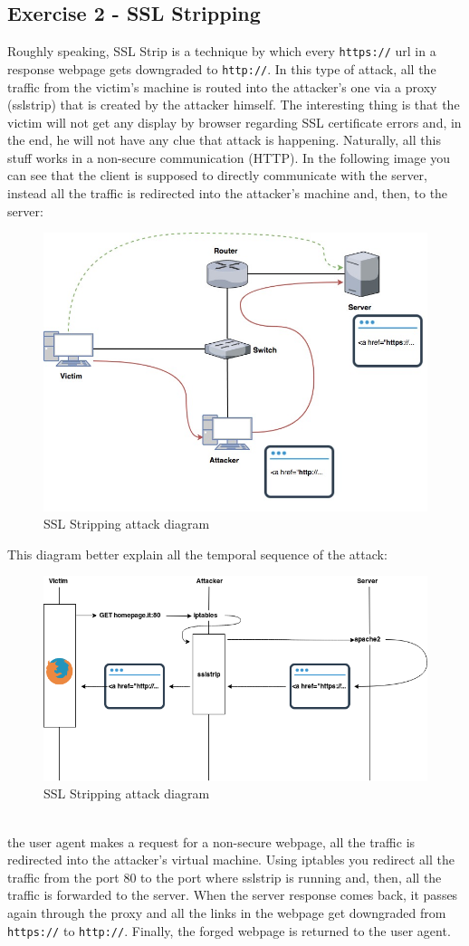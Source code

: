 \documentclass{article}
\begin{document}
\subsection{Exercise 2 - SSL Stripping}
Roughly speaking, SSL Strip is a technique by which every \texttt{https://} url in a response webpage gets downgraded to
\texttt{http://}. In this type of attack, all the traffic from the victim’s machine is routed into the attacker's one via a proxy (sslstrip) that is created by the attacker himself. The interesting thing is that the victim will not get any display by browser regarding SSL certificate errors and, in the end, he will not have any clue that attack is happening. Naturally, all this stuff works in a non-secure communication (HTTP). In the following image you can see that the client is supposed to directly communicate with the server, instead all the traffic is redirected into the attacker's machine and, then, to the server:
\clearpage{}
\begin{figure}[h]
  \center
  \includegraphics[width=.8\textwidth]{../figures/sslstrip}
  \caption{SSL Stripping attack diagram}
\end{figure}
This diagram better explain all the temporal sequence of the attack:
\begin{figure}[h]
  \center
  \includegraphics[width=.8\textwidth]{../figures/sslstrip_time}
  \caption{SSL Stripping attack diagram}
\end{figure}
\\
the user agent makes a request for a non-secure webpage, all the traffic is redirected into the attacker's virtual machine. Using iptables you redirect all the traffic from the port 80 to the port where sslstrip is running and, then, all the traffic is forwarded to the server. When the server response comes back, it passes again through the proxy and all the links in the webpage get downgraded from \texttt{https://} to \texttt{http://}. Finally, the forged webpage is returned to the user agent.
\end{document}
